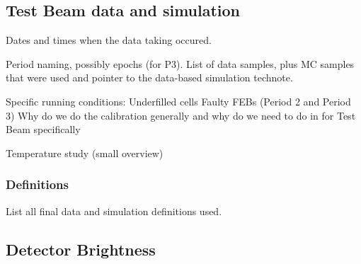 \documentclass[12pt,a4paper]{article}
\begin{document}
\subsection{Test Beam data and simulation}

Dates and times when the data taking occured.

Period naming, possibly epochs (for P3).
List of data samples, plus MC samples that were used and pointer to the data-based simulation technote.

Specific running conditions:
Underfilled cells
Faulty FEBs (Period 2 and Period 3)
Why do we do the calibration generally and why do we need to do in for Test Beam specifically

Temperature study (small overview)

\subsubsection{Definitions}
List all final data and simulation definitions used.

\subsection{Detector Brightness}
\end{document}
